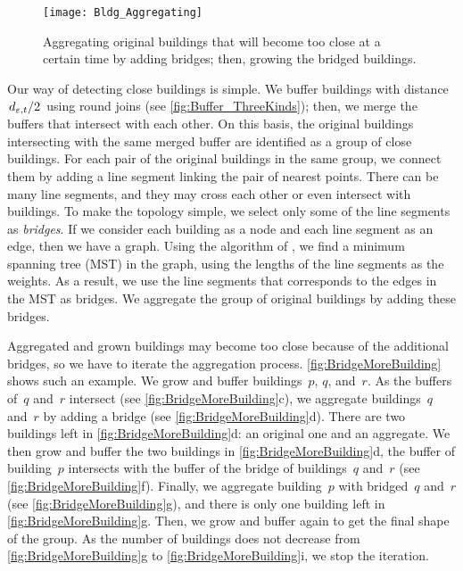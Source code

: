 \begin{figure}[tb]
\centering
\texttt{[image: Bldg\_Aggregating]}
\caption{Aggregating original buildings 
	that will become too close at a certain time 
	by adding bridges;
	then, growing the bridged buildings.}
\label{fig:GrowAndBridge}
\end{figure}

Our way of detecting close buildings is simple.
We buffer buildings with distance 
$\left. d_{\varepsilon,t}\middle/2 \right.$
using round joins
(see \fig\ref{fig:Buffer_ThreeKinds});
then, we merge the buffers that intersect with each other.
On this basis, 
the original buildings intersecting with the same merged buffer 
are identified as a group of close buildings.
For each pair of the original buildings in the same group,
we connect them by adding a line segment 
linking the pair of nearest points.
There can be many line segments, 
and they may cross each other or even intersect with buildings.
To make the topology simple, 
we select only some of the line segments as \emph{bridges}.  
If we consider each building as a node and 
each line segment as an edge, 
then we have a graph.
Using the algorithm of \citet{Prim1957}, 
we find a minimum spanning tree (MST) in the graph,
using the lengths of the line segments as the weights.
As a result, we use the line segments 
that corresponds to the edges in the MST as bridges.
We aggregate the group of original buildings 
by adding these bridges.

Aggregated and grown buildings may become too close 
because of the additional bridges,
so we have to iterate the aggregation process.
\fig\ref{fig:BridgeMoreBuilding} shows such an example.
We grow and buffer buildings~$p$, $q$, and~$r$.
As the buffers of~$q$ and~$r$ intersect
(see \fig\ref{fig:BridgeMoreBuilding}c),
we aggregate buildings~$q$ and~$r$ by adding a bridge
(see \fig\ref{fig:BridgeMoreBuilding}d).
There are two buildings left in 
\fig\ref{fig:BridgeMoreBuilding}d:
an original one and an aggregate.
We then grow and buffer the two buildings in 
\fig\ref{fig:BridgeMoreBuilding}d, 
the buffer of building~$p$ intersects with
the buffer of the bridge of buildings~$q$ and~$r$
(see \fig\ref{fig:BridgeMoreBuilding}f).
Finally, we aggregate building~$p$ with bridged~$q$ and~$r$
(see \fig\ref{fig:BridgeMoreBuilding}g), 
and there is only one building left in 
\fig\ref{fig:BridgeMoreBuilding}g.
Then, we grow and buffer again 
to get the final shape of the group.
As the number of buildings 
does not decrease from \fig\ref{fig:BridgeMoreBuilding}g
to \fig\ref{fig:BridgeMoreBuilding}i,
we stop the iteration.

